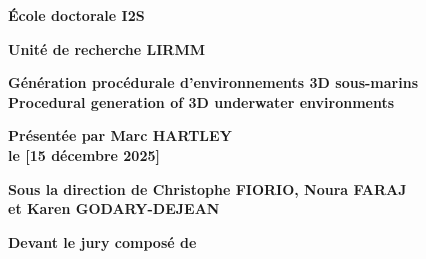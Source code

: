 \begin{titlepage}
{		\bigskip
		\textbf{École doctorale I2S}
		
		\bigskip
		\textbf{Unité de recherche LIRMM}
		
		
		\color{Titleblue}
		\fontsize{17}{20.4}\selectfont
		\vspace{2cm}
		\textbf{Génération procédurale d'environnements 3D sous-marins\\Procedural generation of 3D underwater environments}
		
		
		\vspace{4cm}
		\fontsize{15}{18}\selectfont
		\color{black}
		\textbf{Présentée par Marc HARTLEY \\
			le [15 décembre 2025]}
		
		\bigskip
		\fontsize{13}{15.6}\selectfont
		\textbf{Sous la direction de Christophe FIORIO, 
			Noura FARAJ \\
			et Karen GODARY-DEJEAN}
		
		\vspace{1.5cm}
		\normalsize
		\textbf{Devant le jury composé de}\\
		\bigskip
		\fontsize{10}{12}\selectfont
		\vspace{1.5mm}
		\begin{tabularx}{\textwidth}{l X r}


\end{tabularx}}
\end{titlepage}
